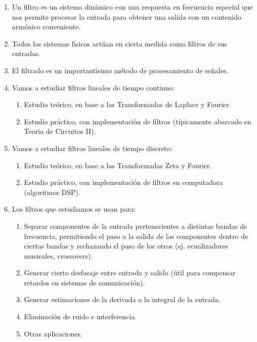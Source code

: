 \documentclass[11pt,a4paper,openany]{book}
\begin{document}
\begin{enumerate} 
	
	\item Un filtro es un sistema din\'{a}mico con una respuesta en frecuencia especial que nos permite procesar la entrada para obtener una salida con un contenido arm\'{o}nico conveniente.
	\item Todos los sistemas f\'{\i}sicos act\'{u}an en cierta medida como filtros de sus entradas.
	\item El filtrado es un important\'{\i}simo m\'{e}todo de procesamiento de se\~{n}ales.
	\item Vamos a estudiar filtros lineales de tiempo continuo:
	\begin{enumerate}
		\item Estudio te\'{o}rico, en base a las Transformadas de Laplace y Fourier.
		\item Estudio pr\'{a}ctico, con implementaci\'{o}n de filtros (típicamente abarcado en Teor\'{\i}a de Circuitos II).
	\end{enumerate}
	
	\item Vamos a estudiar filtros lineales de tiempo discreto: 
	\begin{enumerate}
		\item Estudio te\'{o}rico, en base a las Transformadas Zeta y Fourier.
		\item Estudio pr\'{a}ctico, con implementaci\'{o}n de filtros en computadora (algoritmos DSP).
	\end{enumerate}
	
	\item Los filtros que estudiamos se usan para:
	\begin{enumerate}
		\item Separar componentes de la entrada pertenecientes a distintas bandas de frecuencia, permitiendo el paso a la salida de los componentes dentro de ciertas bandas y rechazando el paso de los otros (ej. ecualizadores musicales, crossovers).
		\item Generar cierto desfasaje entre entrada y salida (\'{u}til para compensar retardos en sistemas de comunicaci\'{o}n).
		\item Generar estimaciones de la derivada o la integral de la entrada.
		\item Eliminaci\'{o}n de ruido e interferencia.
		\item Otras aplicaciones.
	\end{enumerate}
	

\end{enumerate}
\end{document}
